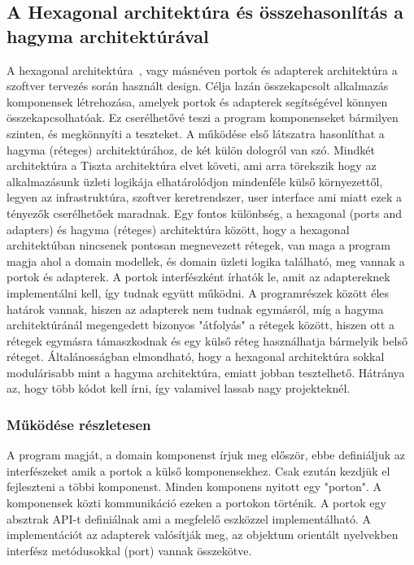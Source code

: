 \subsection{A Hexagonal architektúra és összehasonlítás a hagyma architektúrával}\label{subsec:a-hexagonal-architektúráról-bővebben}
A hexagonal architektúra~\cite{hexagonal}, vagy másnéven portok és adapterek architektúra a szoftver tervezés során használt design.
Célja lazán összekapcsolt alkalmazás komponensek létrehozása, amelyek portok és adapterek segítségével könnyen összekapcsolhatóak.
Ez cserélhetővé teszi a program komponenseket bármilyen szinten, és megkönnyíti a teszteket.
A működése első látszatra hasonlíthat a hagyma (réteges) architektúrához, de két külön dologról van szó.
Mindkét architektúra a Tiszta architektúra \cite{clean-architecture} elvet követi, ami arra törekszik hogy az alkalmazásunk üzleti logikája elhatárolódjon mindenféle külső környezettől, legyen az infrastruktúra, szoftver keretrendszer, user interface ami miatt ezek a tényezők cserélhetőek maradnak.
Egy fontos különbség, a hexagonal (ports and adapters) és hagyma (réteges) architektúra között, hogy a hexagonal architektúban nincsenek pontosan megnevezett rétegek, van maga a program magja ahol a domain modellek, és domain üzleti logika található, meg vannak a portok és adapterek.
A portok interfészként írhatók le, amit az adaptereknek implementálni kell, így tudnak együtt működni.
A programrészek között éles határok vannak, hiszen az adapterek nem tudnak egymásról, míg a hagyma architektúránál megengedett bizonyos "átfolyás" a rétegek között, hiszen ott a rétegek egymásra támaszkodnak és egy külső réteg használhatja bármelyik belső réteget.
Általánosságban elmondható, hogy a hexagonal architektúra sokkal modulárisabb mint a hagyma architektúra, emiatt jobban tesztelhető.
Hátránya az, hogy több kódot kell írni, így valamivel lassab nagy projekteknél.

\subsubsection{Működése részletesen}
A program magját, a domain komponenst írjuk meg először, ebbe definiáljuk az interfészeket amik a portok a külső komponensekhez.
Csak ezután kezdjük el fejleszteni a többi komponenst.
Minden komponens nyitott egy "porton".
A komponensek közti kommunikáció ezeken a portokon történik.
A portok egy absztrak API-t definiálnak ami a megfelelő eszközzel implementálható\cite{hexagonal}.
A implementációt az adapterek valósítják meg, az objektum orientált nyelvekben interfész metódusokkal (port) vannak összekötve.


